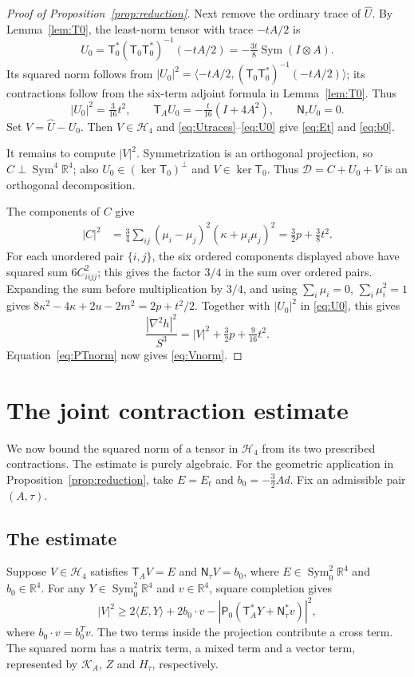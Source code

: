 \documentclass[11pt,a4paper]{amsart}
\numberwithin{equation}{section}
\theoremstyle{definition}
\theoremstyle{remark}
\DeclareMathOperator{\Sym}{Sym}
\newcommand{\R}{\mathbb R}
\newcommand{\K}{\mathcal K}
\newcommand{\T}{\mathsf T}
\newcommand{\N}{\mathsf N}
\newcommand{\Pz}{\mathsf P_0}
\newcommand{\Szero}{\operatorname{Sym}^2_0\R^4}
\newcommand{\Hfour}{\mathscr H_4}
\begin{document}
\begin{proof}[Proof of Proposition~\ref{prop:reduction}]
Next remove the ordinary trace of $\widehat U$.
By Lemma~\ref{lem:T0}, the least-norm tensor with trace
$-tA/2$ is
\[
 U_0=\T_0^*(\T_0\T_0^*)^{-1}(-tA/2)
     =-\tfrac{3t}{8}\Sym(I\otimes A).
\]
Its squared norm follows from
$|U_0|^2=\langle-tA/2,(\T_0\T_0^*)^{-1}(-tA/2)\rangle$;
its contractions follow from the six-term adjoint formula in
Lemma~\ref{lem:T0}. Thus
\begin{equation}\label{eq:U0}
 |U_0|^2=\tfrac3{16}t^2,\qquad
 \T_AU_0=-\tfrac t{16}(I+4A^2),\qquad \N_\tau U_0=0.
\end{equation}
Set $V=\widehat U-U_0$. Then $V\in\Hfour$ and
\eqref{eq:Utraces}--\eqref{eq:U0} give \eqref{eq:Et} and
\eqref{eq:b0}.

It remains to compute $|V|^2$. Symmetrization is an orthogonal projection, so
$C\perp\Sym^4\R^4$; also $U_0\in(\ker\T_0)^\perp$ and
$V\in\ker\T_0$. Thus $\mathcal D=C+U_0+V$ is an orthogonal
decomposition.

The components of $C$ give
\begin{align}
 |C|^2
 &=\tfrac34\sum_{ij}(\mu_i-\mu_j)^2(\kappa+\mu_i\mu_j)^2
 =\tfrac32p+\tfrac38t^2.\label{eq:Cnorm}
\end{align}
For each unordered pair $\{i,j\}$, the six ordered components displayed
above have squared sum $6C_{iijj}^2$; this gives the factor $3/4$ in
the sum over ordered pairs. Expanding the sum before multiplication
by $3/4$, and using
$\sum_i\mu_i=0$, $\sum_i\mu_i^2=1$ gives
$8\kappa^2-4\kappa+2u-2m^2=2p+t^2/2$.
Together with $|U_0|^2$ in \eqref{eq:U0}, this gives
\begin{equation}\label{eq:orthnorm}
 \frac{|\nabla^2h|^2}{S^3}=|V|^2+\tfrac32p+\tfrac9{16}t^2.
\end{equation}
Equation~\eqref{eq:PTnorm} now gives
\eqref{eq:Vnorm}.
\end{proof}

\section{The joint contraction estimate}\label{sec:algebra}
We now bound the squared norm of a tensor in $\Hfour$ from its two
prescribed contractions. The estimate is purely algebraic. For the
geometric application in Proposition~\ref{prop:reduction}, take
$E=E_t$ and $b_0=-\tfrac32Ad$.
Fix an admissible pair $(A,\tau)$.

\subsection{The estimate}
Suppose $V\in\Hfour$ satisfies $\T_AV=E$ and $\N_\tau V=b_0$,
where $E\in\Szero$ and $b_0\in\R^4$. For any $Y\in\Szero$ and
$v\in\R^4$, square completion gives
\[
 |V|^2\ge2\langle E,Y\rangle+2b_0\cdot v
          -|\Pz(\T_A^*Y+\N_\tau^*v)|^2,
\]
where $b_0\cdot v=b_0^Tv$. The two terms inside the projection
contribute a cross term. The squared norm has a matrix term, a
mixed term and a vector term, represented by $\K_A$, $Z$ and
$H_\tau$, respectively.
\end{document}
